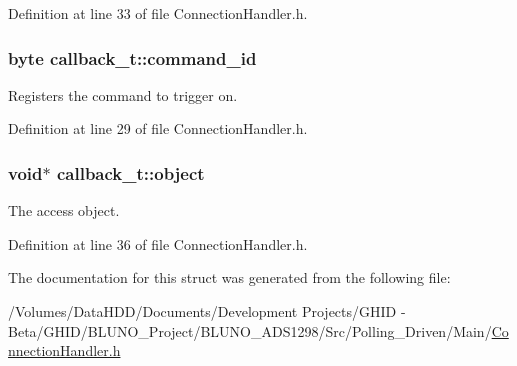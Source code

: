\-Definition at line 33 of file \-Connection\-Handler.\-h.

\hypertarget{structcallback__t_ada2c0e2a936e49f0ece582c40953c278}{
\subsubsection[{command\-\_\-id}]{\setlength{\rightskip}{0pt plus 5cm}byte {\bf callback\-\_\-t\-::command\-\_\-id}}}\label{structcallback__t_ada2c0e2a936e49f0ece582c40953c278}


\-Registers the command to trigger on. 



\-Definition at line 29 of file \-Connection\-Handler.\-h.

\hypertarget{structcallback__t_a30ed93032c0a2ead09070156d7c37790}{
\subsubsection[{object}]{\setlength{\rightskip}{0pt plus 5cm}void$\ast$ {\bf callback\-\_\-t\-::object}}}\label{structcallback__t_a30ed93032c0a2ead09070156d7c37790}


\-The access object. 



\-Definition at line 36 of file \-Connection\-Handler.\-h.



\-The documentation for this struct was generated from the following file\-:\begin{DoxyCompactItemize}
\item 
/\-Volumes/\-Data\-H\-D\-D/\-Documents/\-Development Projects/\-G\-H\-I\-D -\/ Beta/\-G\-H\-I\-D/\-B\-L\-U\-N\-O\-\_\-\-Project/\-B\-L\-U\-N\-O\-\_\-\-A\-D\-S1298/\-Src/\-Polling\-\_\-\-Driven/\-Main/\hyperlink{_connection_handler_8h}{\-Connection\-Handler.\-h}\end{DoxyCompactItemize}
